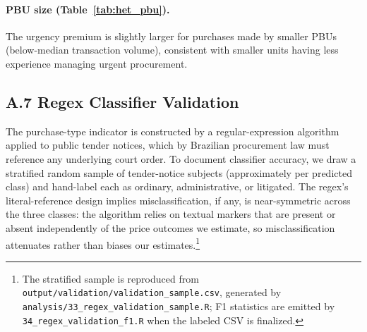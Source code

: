 \paragraph{PBU size (Table~\ref{tab:het_pbu}).}
The urgency premium is slightly larger for purchases made by smaller PBUs (below-median transaction volume), consistent with smaller units having less experience managing urgent procurement.

\subsection*{A.7 Regex Classifier Validation}
\label{sec:appendix_regex}

The purchase-type indicator is constructed by a regular-expression algorithm applied to public tender notices, which by Brazilian procurement law must reference any underlying court order. To document classifier accuracy, we draw a stratified random sample of \BPregexNotices{} tender-notice subjects (approximately \BPregexPerClass{} per predicted class) and hand-label each as ordinary, administrative, or litigated. \BPregexValidationStatus{} The regex's literal-reference design implies misclassification, if any, is near-symmetric across the three classes: the algorithm relies on textual markers that are present or absent independently of the price outcomes we estimate, so misclassification attenuates rather than biases our estimates.\footnote{The stratified sample is reproduced from \texttt{output/validation/validation\_sample.csv}, generated by \texttt{analysis/33\_regex\_validation\_sample.R}; F1 statistics are emitted by \texttt{34\_regex\_validation\_f1.R} when the labeled CSV is finalized.}
